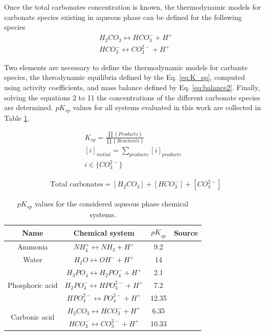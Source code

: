 \documentclass[10pt,a4paper]{article}
\begin{document}
Once the total carbonates concentration is known, the thermodynamic models for carbonate species existing in aqueous phase can be defined for the following species
\begin{align*}
& H_{2}CO_{3} \leftrightarrow HCO_{3}^{-} + H^{+} \\ 
& HCO_{3}^{-} \leftrightarrow CO_{3}^{2-} + H^{+}
\end{align*}

Two elements are necessary to define the thermodynamic models for carbante species, the therodynamic equilibria defined by the Eq. \ref{eq:K_sp}, computed using activity coefficients, and mass balance defined by Eq. \ref{eq:balance2}. Finally, solving the equations 2 to 11 the concentrations of the different carbonate species are determined. $pK_{sp}$ values for all systems evaluated in this work are collected in Table \ref{table:pK}.

\begin{align} \label{eq:K_sp}
& K_{sp} = \frac{ \prod \left\{ Products \right\} }{ \prod \left\{ Reactants \right\}  }&
\\
& \left[ i \right]_{initial} =  \sum_{products} \left[i\right]_{products} \label{eq:balance1}&
\\
& i \in \bigl\{{CO_{3}^{2-}} \bigr\}  \nonumber&
\end{align}

\begin{align} \label{eq:balance2}
& \text{Total carbonates} = \left[  H_{2}CO_{3}\right] + \left[ HCO_{3}^{-}\right] + \left[ CO_{3}^{2-}\right]
\end{align}

\begin{table}[H] 
	\begin{adjustwidth}{}{}
		\centering
		\caption{$pK_{{sp}}$ values for the considered aqueous phase chemical systems.} \label{table:pK}
		\begin{tabular}{c c c c}
			\toprule
			Name	& Chemical system &${pK}_{{sp}}$	&Source	\\ \midrule
			Ammonia & $NH_{4}^{+} \leftrightarrow NH_{3} + H^{+}$	&9.2 &\cite{Bates}	\\ 
			Water & $H_{2}O \leftrightarrow OH^{-} + H^{+}$	&14  &\cite{Skoog}	\\ 
			\multirow{3}{*}{Phosphoric acid} & $H_{3}PO_{4} \leftrightarrow H_{2}PO_{4}^{-} + H^{+}$	&2.1	&\cite{Ohlinger}	\\ 
			&$H_{2}PO_{4}^{-} \leftrightarrow HPO_{4}^{2-} + H^{+}$	&7.2  &\cite{Ohlinger}	\\ 
			&$HPO_{4}^{2-} \leftrightarrow PO_{4}^{3-} + H^{+}$	&12.35 &\cite{Ohlinger}	\\ 
			\multirow{2}{*}{Carbonic acid} & $H_{2}CO_{3} \leftrightarrow HCO_{3}^{-} + H^{+}$	&6.35	&\cite{Skoog}	\\  
			&$HCO_{3}^{-} \leftrightarrow CO_{3}^{2-} + H^{+}$	&10.33	&\cite{Skoog}	\\ \bottomrule
		\end{tabular}
	\end{adjustwidth}
\end{table}
\end{document}
